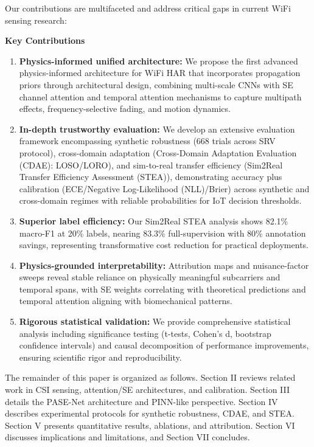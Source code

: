 \documentclass[journal]{IEEEtran}
\begin{document}
Our contributions are multifaceted and address critical gaps in current WiFi sensing research:

\textbf{Key Contributions}
\begin{enumerate}
  \item \textbf{Physics-informed unified architecture:} We propose the first advanced physics-informed architecture for WiFi HAR that incorporates propagation priors through architectural design, combining multi-scale CNNs with SE channel attention and temporal attention mechanisms to capture multipath effects, frequency-selective fading, and motion dynamics.
  \item \textbf{In-depth trustworthy evaluation:} We develop an extensive evaluation framework encompassing synthetic robustness (668 trials across SRV protocol), cross-domain adaptation (Cross-Domain Adaptation Evaluation (CDAE): LOSO/LORO), and sim-to-real transfer efficiency (Sim2Real Transfer Efficiency Assessment (STEA)), demonstrating accuracy plus calibration (ECE/Negative Log-Likelihood (NLL)/Brier) across synthetic and cross-domain regimes with reliable probabilities for IoT decision thresholds.
  \item \textbf{Superior label efficiency:} Our Sim2Real STEA analysis shows 82.1\% macro-F1 at 20\% labels, nearing 83.3\% full-supervision with 80\% annotation savings, representing transformative cost reduction for practical deployments.
  \item \textbf{Physics-grounded interpretability:} Attribution maps and nuisance-factor sweeps reveal stable reliance on physically meaningful subcarriers and temporal spans, with SE weights correlating with theoretical predictions and temporal attention aligning with biomechanical patterns.
  \item \textbf{Rigorous statistical validation:} We provide comprehensive statistical analysis including significance testing (t-tests, Cohen's d, bootstrap confidence intervals) and causal decomposition of performance improvements, ensuring scientific rigor and reproducibility.
\end{enumerate}

The remainder of this paper is organized as follows. Section II reviews related work in CSI sensing, attention/SE architectures, and calibration. Section III details the PASE-Net architecture and PINN-like perspective. Section IV describes experimental protocols for synthetic robustness, CDAE, and STEA. Section V presents quantitative results, ablations, and attribution. Section VI discusses implications and limitations, and Section VII concludes.
\end{document}
